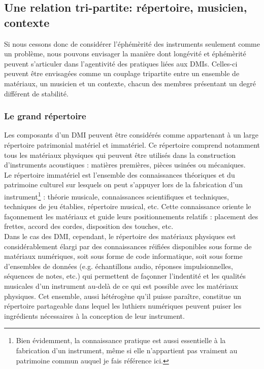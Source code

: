 \subsection{Une relation tri-partite: répertoire, musicien, contexte}

\noindent Si nous cessons donc de considérer l'éphémèrité des instruments seulement comme un problème, nous pouvons envisager la manière dont longévité et éphémèrité peuvent s'articuler dans l'agentivité des pratiques liées aux \glspl{DMI}. Celles-ci peuvent être envisagées comme un couplage tripartite entre un ensemble de matériaux, un musicien et un contexte, chacun des membres présentant un degré différent de stabilité.

\subsubsection{Le grand répertoire}

\noindent Les composants d'un \gls{DMI} peuvent être considérés comme appartenant à un large répertoire patrimonial matériel et immatériel. Ce répertoire comprend notamment tous les matériaux physiques qui peuvent être utilisés dans la construction d'instruments acoustiques : matières premières, pièces usinées ou mécaniques. \\
\indent Le répertoire immatériel est l'ensemble des connaissances théoriques et du patrimoine culturel sur lesquels on peut s'appuyer lors de la fabrication d'un instrument\footnote{Bien évidemment, la connaissance pratique est aussi essentielle à la fabrication d'un instrument, même si elle n'appartient pas vraiment au patrimoine commun auquel je fais référence ici.} : théorie musicale, connaissances scientifiques et techniques, techniques de jeu établies, répertoire musical, etc. Cette connaissance oriente le façonnement les matériaux et guide leurs positionnements relatifs :  placement des frettes, accord des cordes, disposition des touches, etc.\\
\indent Dans le cas des \gls{DMI}, cependant, le répertoire des matériaux physiques est considérablement élargi par des connaissances réifiées disponibles sous forme de matériaux numériques, soit sous forme de code informatique, soit sous forme d'ensembles de données (e.g. échantillons audio, réponses impulsionnelles, séquences de notes, etc.) qui permettent de façonner l'indentité et les qualités musicales d'un instrument au-delà de ce qui est possible avec les matériaux physiques.
Cet ensemble, aussi hétérogène qu'il puisse paraître, constitue un répertoire partageable dans lequel les luthiers numériques peuvent puiser les ingrédients nécessaires à la conception de leur instrument.

